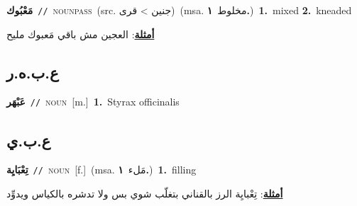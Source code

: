 \documentclass[10pt,a4paper,twoside]{article} %
\begin{document}
\begin{multicols}{2}
{{{{{{{{{\setlength\topsep{0pt}\textbf{\foreignlanguage{arabic}{مَعْبُوك}}\ {\color{gray}\texttt{//}\color{black}}\ \textsc{noun\textunderscore pass}\ (src. \color{gray}\foreignlanguage{arabic}{جنين > قرى}\color{black})\ \color{gray}(msa. \foreignlanguage{arabic}{مخلوط}~\foreignlanguage{arabic}{\textbf{١.}})\color{black}\ \textbf{1.}~mixed  \textbf{2.}~kneaded\  \begin{flushright}\color{gray}\foreignlanguage{arabic}{\textbf{\underline{\foreignlanguage{arabic}{أمثلة}}}: العجين مش باقي مَعبوك مليح}\end{flushright}\color{black}} \vspace{2mm}

\vspace{-3mm}
\subsection*{\color{blue}\foreignlanguage{arabic}{ع.ب.ه.ر}\color{blue}{ (ntws)}} 

{\setlength\topsep{0pt}\textbf{\foreignlanguage{arabic}{عَبْهَر}}\ {\color{gray}\texttt{//}\color{black}}\ \textsc{noun}\ [m.]\ \textbf{1.}~Styrax officinalis\ 

\vspace{-3mm}
\subsection*{\color{blue}\foreignlanguage{arabic}{ع.ب.ي}\color{blue}{}} 

{\setlength\topsep{0pt}\textbf{\foreignlanguage{arabic}{تِعْبَايِة}}\ {\color{gray}\texttt{//}\color{black}}\ \textsc{noun}\ [f.]\ \color{gray}(msa. \foreignlanguage{arabic}{مَلء}~\foreignlanguage{arabic}{\textbf{١.}})\color{black}\ \textbf{1.}~filling\  \begin{flushright}\color{gray}\foreignlanguage{arabic}{\textbf{\underline{\foreignlanguage{arabic}{أمثلة}}}: تِعْبايِة الرز بالقناني بتغلّب شوي بس ولا تدشره بالكياس ويدوِّد}\end{flushright}\color{black}} \vspace{2mm}

}}}}}}}}}
\end{multicols}
\end{document}
